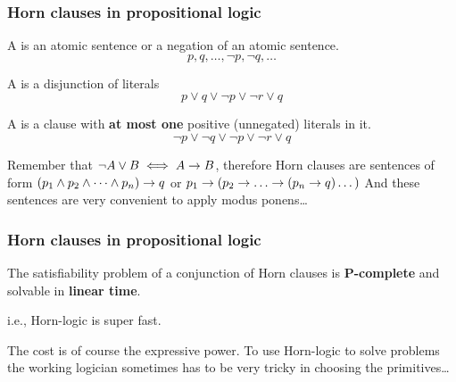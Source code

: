 
\begin{frame}[t]
\frametitle{Horn clauses in propositional logic}
\begin{defi}
  A  is an atomic sentence or a negation of an atomic sentence.
    \[p, q, \dots, \lnot p, \lnot q, \dots \]
\end{defi}
\begin{defi}
  A  is a disjunction of literals
  \[p\lor q\lor \lnot p\lor \lnot r\lor q\]
\end{defi}
\begin{defi}
  A  is a clause with \textbf{at most one} positive (unnegated) literals in it.
  \[\lnot p\lor \lnot q\lor \lnot p\lor \lnot r\lor q\]
\end{defi}
Remember that $\lnot A \lor B \iff A\rightarrow B$, therefore Horn clauses are sentences of form
$(p_1\land p_2\land \dots \land p_n) \rightarrow q$ or $p_1\lthen (p_2\lthen \dots \lthen (p_n \lthen q)\dots )$
And these sentences are very convenient to apply modus ponens\dots
\end{frame}

\begin{frame}[t]
\frametitle{Horn clauses in propositional logic}
\begin{tete}
The satisfiability problem of a conjunction of Horn clauses is \textbf{P-complete} and solvable in \textbf{linear time}.
\end{tete}
i.e., Horn-logic is super fast.

The cost is of course the expressive power. To use Horn-logic to solve problems the working logician sometimes has to be very tricky in choosing the primitives\dots

\end{frame}


